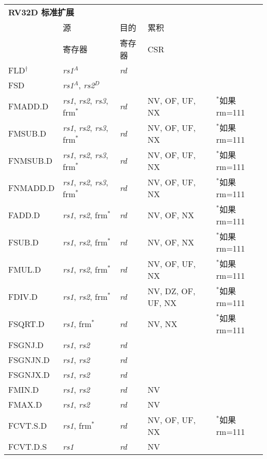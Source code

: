 \begin{tabular}{p{3cm}|p{3cm}|p{2cm}|p{4cm}|p{4cm}}
  \multicolumn{4}{l}{\bf RV32D 标准扩展} \\
  \cline{2-4}
    & 源    & 目的 & 累积 \\
    & 寄存器 & 寄存器   & CSR \\
  \cline{2-4}
   FLD$^\dagger$ & {\em rs1}$^A$ & {\em rd} &   & \\
   \cline{2-4}
   FSD & {\em rs1}$^A$, {\em rs2}$^D$ &  &   & \\
   \cline{2-4}
   FMADD.D & {\em rs1}, {\em rs2},  {\em rs3}, frm$^*$ & {\em rd} & NV, OF, UF, NX & $^*$如果rm=111  \\
   \cline{2-4}
   FMSUB.D & {\em rs1}, {\em rs2},  {\em rs3}, frm$^*$ & {\em rd} & NV, OF, UF, NX & $^*$如果rm=111  \\
   \cline{2-4}
   FNMSUB.D & {\em rs1}, {\em rs2},  {\em rs3}, frm$^*$ & {\em rd} & NV, OF, UF, NX & $^*$如果rm=111  \\
   \cline{2-4}
   FNMADD.D & {\em rs1}, {\em rs2},  {\em rs3}, frm$^*$ & {\em rd} & NV, OF, UF, NX & $^*$如果rm=111  \\
   \cline{2-4}
   FADD.D & {\em rs1}, {\em rs2}, frm$^*$ & {\em rd} & NV, OF, NX & $^*$如果rm=111  \\
   \cline{2-4}
   FSUB.D & {\em rs1}, {\em rs2}, frm$^*$ & {\em rd} & NV, OF, NX & $^*$如果rm=111  \\
   \cline{2-4}
   FMUL.D & {\em rs1}, {\em rs2}, frm$^*$ & {\em rd} & NV, OF, UF, NX & $^*$如果rm=111  \\
   \cline{2-4}
   FDIV.D & {\em rs1}, {\em rs2}, frm$^*$ & {\em rd} & NV, DZ, OF, UF, NX & $^*$如果rm=111  \\
   \cline{2-4}
   FSQRT.D & {\em rs1}, frm$^*$ & {\em rd} & NV, NX & $^*$如果rm=111  \\
   \cline{2-4}
   FSGNJ.D & {\em rs1}, {\em rs2} & {\em rd} &   & \\
   \cline{2-4}
   FSGNJN.D & {\em rs1}, {\em rs2} & {\em rd} &   & \\
   \cline{2-4}
   FSGNJX.D & {\em rs1}, {\em rs2} & {\em rd} &   & \\
   \cline{2-4}
   FMIN.D & {\em rs1}, {\em rs2} & {\em rd} & NV &   \\
   \cline{2-4}
   FMAX.D & {\em rs1}, {\em rs2} & {\em rd} & NV &   \\
   \cline{2-4}
   FCVT.S.D & {\em rs1}, frm$^*$ & {\em rd} & NV, OF, UF, NX & $^*$如果rm=111  \\
   \cline{2-4}
   FCVT.D.S & {\em rs1} & {\em rd} & NV &   \\

\end{tabular}
